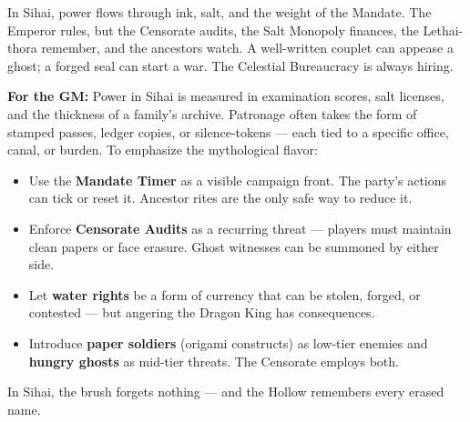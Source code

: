 \begin{tcolorbox}[colback=black!3,colframe=black!40!white,title={Patronage \& Power},breakable]
In Sihai, power flows through ink, salt, and the weight of the Mandate. The Emperor rules, but the Censorate audits, the Salt Monopoly finances, the Lethai-thora remember, and the ancestors watch. A well-written couplet can appease a ghost; a forged seal can start a war. The Celestial Bureaucracy is always hiring.

\textbf{For the GM:}  
Power in Sihai is measured in examination scores, salt licenses, and the thickness of a family's archive. Patronage often takes the form of stamped passes, ledger copies, or silence-tokens --- each tied to a specific office, canal, or burden. To emphasize the mythological flavor:
\begin{itemize}
\item Use the \textbf{Mandate Timer } as a visible campaign front. The party's actions can tick or reset it. Ancestor rites are the only safe way to reduce it.
\item Enforce \textbf{Censorate Audits} as a recurring threat --- players must maintain clean papers or face erasure. Ghost witnesses can be summoned by either side.
\item Let \textbf{water rights} be a form of currency that can be stolen, forged, or contested --- but angering the Dragon King has consequences.
\item Introduce \textbf{paper soldiers} (origami constructs) as low-tier enemies and \textbf{hungry ghosts} as mid-tier threats. The Censorate employs both.
\end{itemize}
In Sihai, the brush forgets nothing --- and the Hollow remembers every erased name.
\end{tcolorbox}

